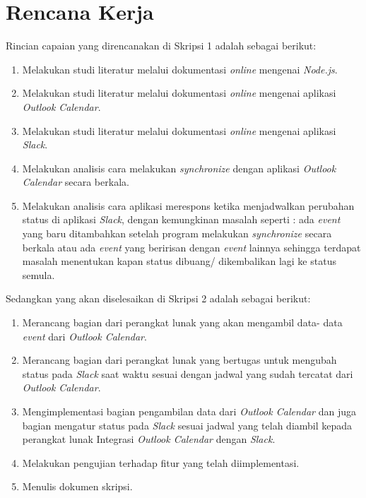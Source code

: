 \documentclass[a4paper,twoside]{article}
\begin{document}
\section{Rencana Kerja}
Rincian capaian yang direncanakan di Skripsi 1 adalah sebagai berikut:

\begin{enumerate}
\item Melakukan studi literatur melalui dokumentasi \textit{online} mengenai \textit{Node.js}.
		\item Melakukan studi literatur melalui dokumentasi \textit{online} mengenai aplikasi \textit{Outlook Calendar}.
		\item Melakukan studi literatur melalui dokumentasi \textit{online} mengenai aplikasi \textit{Slack}. 
		\item Melakukan analisis cara melakukan \textit{synchronize} dengan aplikasi \textit{Outlook Calendar} secara berkala.
		\item Melakukan analisis cara aplikasi merespons ketika menjadwalkan perubahan status di aplikasi \textit{Slack}, dengan kemungkinan masalah seperti : ada \textit{event} yang baru ditambahkan setelah program melakukan \textit{synchronize} secara berkala atau ada \textit{event} yang beririsan dengan \textit{event} lainnya sehingga terdapat masalah menentukan kapan status dibuang/ dikembalikan lagi ke status semula. 
\end{enumerate}

Sedangkan yang akan diselesaikan di Skripsi 2 adalah sebagai berikut:

\begin{enumerate}
\item Merancang bagian dari perangkat lunak yang akan mengambil data- data \textit{event} dari \textit{Outlook Calendar}. 
		\item Merancang bagian dari perangkat lunak yang bertugas untuk mengubah status pada \textit{Slack} saat waktu sesuai dengan jadwal yang sudah tercatat dari \textit{Outlook Calendar}.
		\item Mengimplementasi bagian pengambilan data dari \textit{Outlook Calendar} dan juga bagian mengatur status pada \textit{Slack} sesuai jadwal yang telah diambil kepada perangkat lunak Integrasi \textit{Outlook Calendar} dengan \textit{Slack}.
		\item Melakukan pengujian terhadap fitur yang telah diimplementasi.
		\item Menulis dokumen skripsi.
\end{enumerate}
\end{document}
